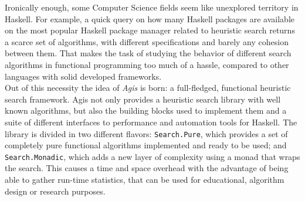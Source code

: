 Ironically enough, some Computer Science fields seem like unexplored territory
in Haskell. For example, a quick query on how many Haskell packages are
available on the most popular Haskell package manager related to heuristic
search returns a scarce set of algorithms, with different specifications and
barely any cohesion between them. That makes the task of studying the behavior
of different search algorithms in functional programming too much of a hassle,
compared to other languages with solid developed frameworks.\\

Out of this necessity the idea of \emph{Agis} is born: a full-fledged,
functional heuristic search framework. Agis not only provides a heuristic
search library with well known algorithms, but also the building blocks used to
implement them and a suite of different interfaces to performance and
automation tools for Haskell. The library is divided in two different flavors:
\texttt{Search.Pure}, which provides a set of completely pure functional
algorithms implemented and ready to be used; and \texttt{Search.Monadic}, which
adds a new layer of complexity using a monad that wraps the search. This causes
a time and space overhead with the advantage of being able to gather run-time
statistics, that can be used for educational, algorithm design or research
purposes. 

\newpage